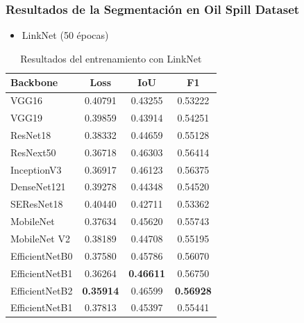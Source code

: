 \begin{frame}
\frametitle{Resultados de la Segmentación en Oil Spill Dataset}

\begin{itemize}
    \item LinkNet (50 épocas)
\end{itemize}
    \begin{table}[]
        \centering
        \small
        \begin{tabular}{l|c|c|c}
            \hline
            Backbone        & Loss    & IoU     & F1 \\
            \hline
            VGG16           & 0.40791 & 0.43255 & 0.53222 \\
            VGG19           & 0.39859 & 0.43914 & 0.54251 \\
            ResNet18        & 0.38332 & 0.44659 & 0.55128 \\
            ResNext50       & 0.36718 & 0.46303 & 0.56414 \\ 
            InceptionV3     & 0.36917 & 0.46123 & 0.56375 \\
            DenseNet121     & 0.39278 & 0.44348 & 0.54520 \\
            SEResNet18      & 0.40440 & 0.42711 & 0.53362 \\
            MobileNet       & 0.37634 & 0.45620 & 0.55743 \\ 
            MobileNet V2    & 0.38189 & 0.44708 & 0.55195 \\
            EfficientNetB0  & 0.37580 & 0.45786 & 0.56070 \\
            EfficientNetB1  & 0.36264 & \textbf{0.46611} & 0.56750 \\
            EfficientNetB2  & \textbf{0.35914} & 0.46599 & \textbf{0.56928} \\
            EfficientNetB1  & 0.37813 & 0.45397 & 0.55441 \\
            \hline
        \end{tabular}
        \caption{Resultados del entrenamiento con LinkNet}
        \label{tab:my_label}
    \end{table}
\end{frame}

